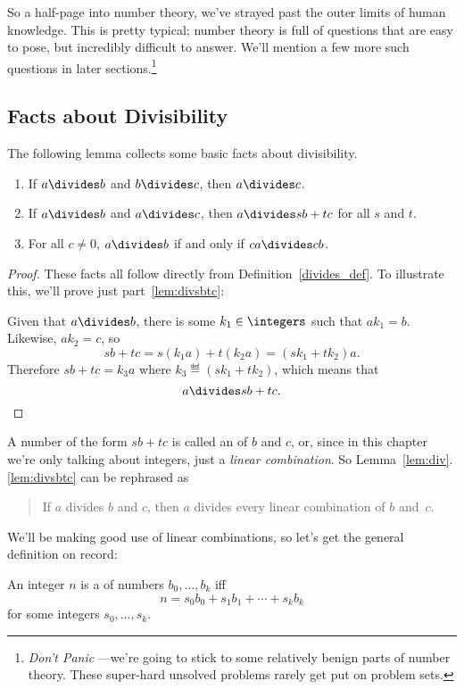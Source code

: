 So a half-page into number theory, we've strayed past the outer limits of human knowledge.
This is pretty typical; number theory is full of questions that are easy to pose, but
incredibly difficult to answer.  We'll mention a few more such questions in later
sections.\footnote{\emph{Don't Panic} ---we're going to stick to some relatively benign
  parts of number theory.  These super-hard unsolved problems rarely get put on problem
  sets.}

\subsection{Facts about Divisibility}

The following lemma collects some basic facts about divisibility.

\begin{lemma}\label{lem:div}\mbox{}
\begin{enumerate}

\item\label{lem:divtrans} If $a \divides b$ and $b \divides c$, then $a \divides c$.

\item\label{lem:divsbtc} If $a \divides b$ and $a \divides c$, then $a \divides sb + tc$
  for all $s$ and $t$.

\item\label{lem:divcancel} For all $c \neq 0$, $a \divides b$ if and only if $ca \divides
  cb$.
\end{enumerate}
\end{lemma}

\begin{proof}
These facts all follow directly from Definition~\ref{divides_def}.  To
illustrate this, we'll prove just part~\ref{lem:divsbtc}:

Given that $a \divides b$, there is some $k_1 \in \integers$ such that $a k_1 = b$.
Likewise, $a k_2 = c$, so
\[
sb+tc= s(k_1a) + t(k_2a) = (sk_1+tk_2)a.
\]
Therefore $sb+tc = k_3a$ where $k_3 \eqdef (sk_1+tk_2)$, which means that
\[
a \divides sb+tc.
\]
\end{proof}

A number of the form $sb+tc$ is called an  of $b$ and $c$, or, since in this chapter we're only
talking about integers, just a \emph{linear combination}.  So
Lemma~\ref{lem:div}.\ref{lem:divsbtc} can be rephrased as
\begin{quote}
If $a$ divides $b$ and $c$, then $a$ divides every linear combination
of $b$ and~$c$.
\end{quote}
We'll be making good use of linear combinations, so let's get the
general definition on record:
\begin{definition}\label{linear_def}
An integer $n$ is a  of numbers $b_0,\dots,b_k$ iff
\[
n = s_0b_0+s_1b_1+\cdots+s_kb_k
\]
for some integers $s_0,\dots,s_k$.
\end{definition}

